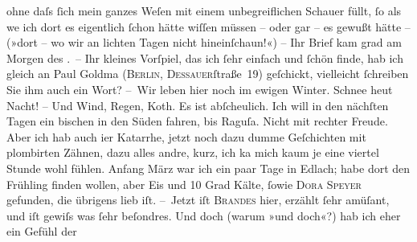 \begin{ledgroupsized}[t]{13cm}
               ohne daſs ſich mein ganzes Weſen mit einem unbegreiflichen Schauer füllt, ſo als we{\geminationn} ich dort es eigentlich ſchon hätte wiſſen müssen – {\pb}oder gar – es gewußt hätte – (»dort – wo wir an lichten Tagen nicht
                  hineinſchaun!«) – Ihr Brief kam grad am Morgen des \label{K_L01024-1v}\label{K_L01024-1h}. –\pend
           \pstart
           Ihr kleines Vorſpiel, das ich
               ſehr einfach und ſchön finde, hab ich gleich an Paul Goldma{\geminationn} (\textsc{Berlin}, \textsc{Dessauer}ſtraße 19) geſchickt, vielleicht ſchreiben
               Sie ihm auch ein Wort? \pend
           \pstart
           – Wir leben hier noch im ewigen {\pb}Winter. Schnee heut
               Nacht! – Und Wind, Regen, Koth. Es ist abſcheulich. Ich will in den nächſten Tagen
               ein bischen in den Süden fahren, bis Raguſa.
               Nicht mit rechter Freude. Aber ich hab auch i{\geminationm}er
               Katarrhe, jetzt noch dazu dumme Geſchichten mit plombirten Zähnen, dazu alles andre,
               kurz, ich ka{\geminationn}{ }{\pb}mich kaum je eine viertel Stunde wohl fühlen.
                  Anfang März war ich ein paar Tage in Edlach; habe dort den Frühling finden wollen, aber Eis und 10 Grad Kälte,
               ſowie \textsc{Dora Speyer} gefunden, die übrigens lieb iſt.\pend
           \pstart
           – Jetzt iſt \textsc{Brandes} hier, erzählt ſehr amüſant, und iſt gewiſs was ſehr beſondres. Und {\pb}doch (warum »und doch«?) hab ich eher ein Gefühl der

\end{ledgroupsized}
